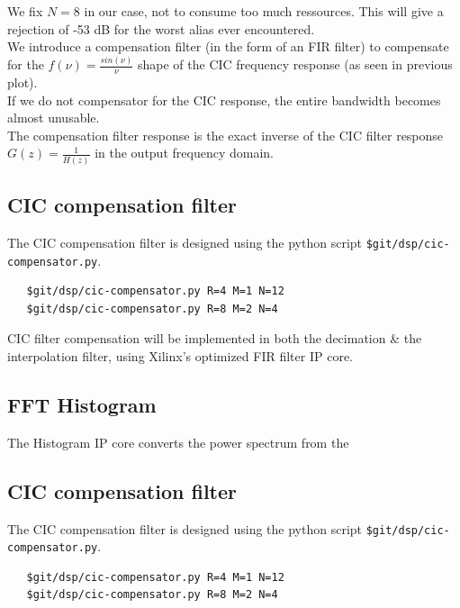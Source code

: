\documentclass{article}
\begin{document}
We fix $N=8$ in our case, not to consume too much ressources.
This will give a rejection of
-53 dB for the worst alias ever encountered. \\

We introduce a compensation filter (in the form of an FIR
filter) to compensate for the  $f(\nu) = \frac{sin(\nu)}{\nu}$ shape
of the CIC frequency response (as seen in previous plot). \\

If we do not compensator for the CIC response, the entire bandwidth
becomes almost unusable. \\

The compensation filter response is the exact inverse
of the CIC filter response $G(z) = \frac{1}{H(z)}$ 
in the output frequency domain. \\

\subsection{CIC compensation filter}

The CIC compensation filter is designed
using the python script {\tt \$git/dsp/cic-compensator.py}. 

\begin{verbatim}
   $git/dsp/cic-compensator.py R=4 M=1 N=12
   $git/dsp/cic-compensator.py R=8 M=2 N=4
\end{verbatim}

CIC filter compensation 
will be implemented in both the decimation
\& the interpolation filter, using
Xilinx's optimized FIR filter IP core. \\

\subsection{FFT Histogram}

The Histogram IP core converts
the power spectrum from the

\subsection{CIC compensation filter}

The CIC compensation filter is designed
using the python script {\tt \$git/dsp/cic-compensator.py}. 

\begin{verbatim}
   $git/dsp/cic-compensator.py R=4 M=1 N=12
   $git/dsp/cic-compensator.py R=8 M=2 N=4
\end{verbatim}
\end{document}
